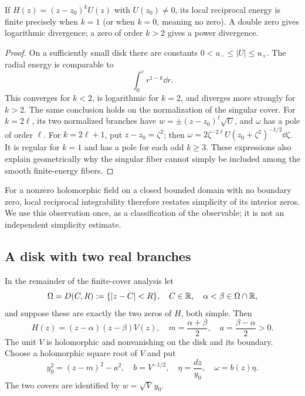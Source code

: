 \begin{proposition}\label{prop:multi}
If $H(z)=(z-z_0)^kU(z)$ with $U(z_0)\ne0$, its local reciprocal energy
is finite precisely when $k=1$ (or when $k=0$, meaning no zero).
A double zero gives logarithmic divergence; a zero of order $k>2$
gives a power divergence.
\end{proposition}
\begin{proof}
On a sufficiently small disk there are constants $0<u_-\le|U|\le u_+$.
The radial energy is comparable to
\begin{equation}\label{eq:radial}
 \int_0^\varepsilon r^{1-k}\dd r.
\end{equation}
This converges for $k<2$, is logarithmic for $k=2$, and diverges more
strongly for $k>2$.
The same conclusion holds on the normalization of the singular cover.
For $k=2\ell$, its two normalized branches have
$w=\pm(z-z_0)^\ell\sqrt U$, and $\omega$ has a pole of order $\ell$.
For $k=2\ell+1$, put $z-z_0=\zeta^2$; then
$\omega=2\zeta^{-2\ell}U(z_0+\zeta^2)^{-1/2}\dd\zeta$.
It is regular for $k=1$ and has a pole for each odd $k\ge3$.
These expressions also explain geometrically why the singular fiber
cannot simply be included among the smooth finite-energy fibers.
\end{proof}

For a nonzero holomorphic field on a closed bounded domain with no boundary
zero, local reciprocal integrability therefore restates simplicity of its
interior zeros. We use this observation once, as a classification of the
observable; it is not an independent simplicity estimate.

\subsection{A disk with two real branches}
In the remainder of the finite-cover analysis let
\begin{equation}\label{eq:diskpair}
 \Omega=D(C,R):=\{|z-C|<R\},\quad C\in\mathbb R,\quad
 \alpha<\beta\in\Omega\cap\mathbb R,
\end{equation}
and suppose these are exactly the two zeros of $H$, both simple. Then
\begin{equation}\label{eq:unitfactor}
 H(z)=(z-\alpha)(z-\beta)V(z),\quad
 m=\frac{\alpha+\beta}{2},\quad a=\frac{\beta-\alpha}{2}>0.
\end{equation}
The unit $V$ is holomorphic and nonvanishing on the disk and its boundary.
Choose a holomorphic square root of $V$ and put
\begin{equation}\label{eq:eta}
 y_0^2=(z-m)^2-a^2,\quad b=V^{-1/2},\quad
 \eta=\frac{dz}{y_0},\quad \omega=b(z)\eta.
\end{equation}
The two covers are identified by $w=\sqrt V\,y_0$.

